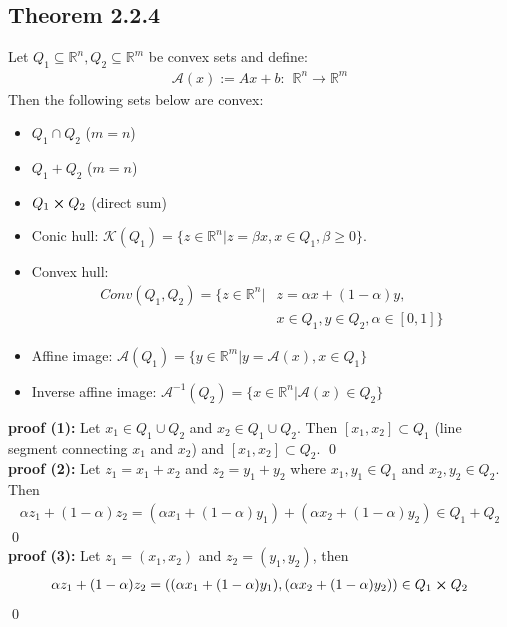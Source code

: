 \documentclass[12pt,a4paper]{article}
\begin{document}
	\subsection*{Theorem 2.2.4}\label{thm224}
	Let $Q_1 \subseteq \mathbb{R}^n, Q_2 \subseteq \mathbb{R}^m$ be convex sets and define:
	\begin{align*}
		\mathcal{A}(x) := Ax + b: \hspace{5pt} \mathbb{R}^n \rightarrow \mathbb{R}^m
	\end{align*}
	Then the following sets below are convex:
	\begin{itemize}
		\item $Q_1 \cap Q_2$  ($m=n$)
		\item $Q_1 + Q_2$ ($m=n$)
		\item $Q_1 \cross Q_2$ (direct sum)
		\item Conic hull: $\mathcal{K}(Q_1) = \{ z \in \mathbb{R}^n | z = \beta x, x \in Q_1, \beta \geq 0\}$.
		\item Convex hull:
		\begin{align*}
			Conv(Q_1, Q_2) = \{z \in \mathbb{R}^n | &z = \alpha x + (1 - \alpha)y, \\ 
			&  x \in Q_1, y \in Q_2, \alpha \in [0,1]\}
		\end{align*}
		\item Affine image: $\mathcal{A}(Q_1) = \{y \in \mathbb{R}^m | y = \mathcal{A}(x), x \in Q_1\}$
		\item Inverse affine image: $\mathcal{A}^{-1}(Q_2) = \{x \in \mathbb{R}^n | \mathcal{A}(x) \in Q_2\}$
	\end{itemize}
	\textbf{proof (1):} Let $x_1 \in Q_1 \cup Q_2$ and $x_2 \in Q_1 \cup Q_2$. Then $[x_1,x_2] \subset Q_1$ (line segment connecting $x_1$ and $x_2$) and $[x_1, x_2] \subset Q_2$. \qed \\
	\textbf{proof (2):} Let $z_1 = x_1 + x_2$ and $z_2 = y_1 + y_2$ where $x_1, y_1 \in Q_1$ and $x_2, y_2 \in Q_2$. Then 
	\begin{align*}
		\alpha z_1 + (1 - \alpha)z_2 = (\alpha x_1 + (1 - \alpha)y_1) + (\alpha x_2 + (1 - \alpha)y_2) \in Q_1 + Q_2
	\end{align*} 
	\qed \\
	\textbf{proof (3):} Let $z_1 = (x_1, x_2)$ and $z_2 = (y_1, y_2)$, then
	\begin{align*}
		\alpha z_1 + (1 - \alpha)z_2 = ((\alpha x_1 + (1 - \alpha)y_1), (\alpha x_2 + (1 - \alpha)y_2)) \in Q_1 \cross Q_2
	\end{align*}
	\qed \\
\end{document}
